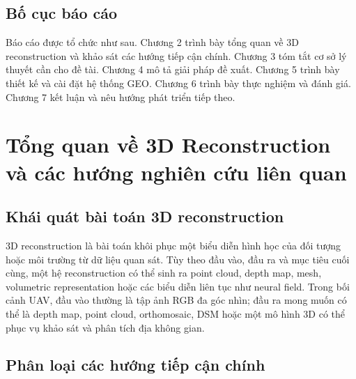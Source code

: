 \documentclass[12pt,a4paper,oneside]{report}
\begin{document}
\section{Bố cục báo cáo}

Báo cáo được tổ chức như sau. Chương 2 trình bày tổng quan về 3D reconstruction và khảo sát các hướng tiếp cận chính. Chương 3 tóm tắt cơ sở lý thuyết cần cho đề tài. Chương 4 mô tả giải pháp đề xuất. Chương 5 trình bày thiết kế và cài đặt hệ thống GEO. Chương 6 trình bày thực nghiệm và đánh giá. Chương 7 kết luận và nêu hướng phát triển tiếp theo.

\chapter{Tổng quan về 3D Reconstruction và các hướng nghiên cứu liên quan}

\section{Khái quát bài toán 3D reconstruction}

3D reconstruction là bài toán khôi phục một biểu diễn hình học của đối tượng hoặc môi trường từ dữ liệu quan sát. Tùy theo đầu vào, đầu ra và mục tiêu cuối cùng, một hệ reconstruction có thể sinh ra point cloud, depth map, mesh, volumetric representation hoặc các biểu diễn liên tục như neural field. Trong bối cảnh UAV, đầu vào thường là tập ảnh RGB đa góc nhìn; đầu ra mong muốn có thể là depth map, point cloud, orthomosaic, DSM hoặc một mô hình 3D có thể phục vụ khảo sát và phân tích địa không gian.

\section{Phân loại các hướng tiếp cận chính}
\end{document}
